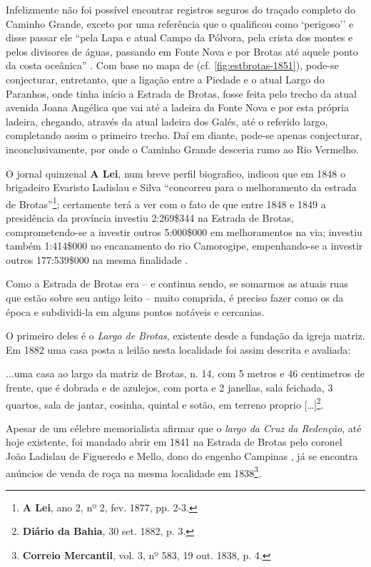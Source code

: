 Infelizmente não foi possível encontrar registros seguros do traçado completo do Caminho Grande, exceto por uma referência que o qualificou como `perigoso'' e disse passar ele ``pela Lapa e atual Campo da Pólvora, pela crista dos montes e pelos divisores de águas, passando em Fonte Nova e por Brotas até aquele ponto da costa oceânica'' \cite[p.~488]{sampaio_salvador_2016}. Com base no mapa de  (cf. \autoref{fig:estbrotas-1851}), pode-se conjecturar, entretanto, que a ligação entre a Piedade e o atual Largo do Paranhos, onde tinha início a Estrada de Brotas, fosse feita pelo trecho da atual avenida Joana Angélica que vai até a ladeira da Fonte Nova e por esta própria ladeira, chegando, através da atual ladeira dos Galés, até o referido largo, completando assim o primeiro trecho. Daí em diante, pode-se apenas conjecturar, inconclusivamente, por onde o Caminho Grande desceria rumo ao Rio Vermelho.

O jornal quinzenal \textbf{A Lei}, num breve perfil biografico, indicou que em 1848 o brigadeiro Evaristo Ladislau e Silva ``concorreu para o melhoramento da estrada de Brotas''\footnote{\textbf{A Lei}, ano 2, nº 2, fev. 1877, pp. 2-3.}; certamente terá a ver com o fato de que entre 1848 e 1849 a presidência da província investiu 2:269\$344 na Estrada de Brotas, comprometendo-se a investir outros 5:000\$000 em melhoramentos na via; investiu também 1:414\$000 no encanamento do rio Camorogipe, empenhando-se a investir outros 177:539\$000 na mesma finalidade \cite{bahia_rpe_1849}.

Como a Estrada de Brotas era -- e continua sendo, se somarmos as atuais ruas que estão sobre seu antigo leito -- muito comprida, é preciso fazer como os da época e subdividi-la em alguns pontos notáveis e cercanias.

O primeiro deles é o \textit{Largo de Brotas}, existente desde a fundação da igreja matriz. Em 1882 uma casa posta a leilão nesta localidade foi assim descrita e avaliada:

\begin{citacao}
...uma casa ao largo da matriz de Brotas, n. 14, com 5 metros e 46 centimetros de frente, que é dobrada e de azulejos, com porta e 2 janellas, sala feichada, 3 quartos, sala de jantar, cosinha, quintal e sotão, em terreno proprio [\dots]\footnote{\textbf{Diário da Bahia}, 30 set. 1882, p. 3.}.
\end{citacao}

Apesar de um célebre memorialista afirmar que o \textit{largo da Cruz da Redenção}, até hoje existente, foi mandado abrir em 1841 na Estrada de Brotas pelo coronel João Ladislau de Figueredo e Mello, dono do engenho Campinas \cite[p.~88]{campos_brotas_1942}, já se encontra anúncios de venda de roça na mesma localidade em 1838\footnote{\textbf{Correio Mercantil}, vol. 3, nº 583, 19 out. 1838, p. 4.}.


